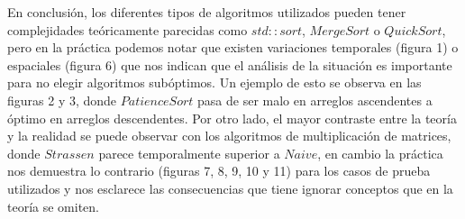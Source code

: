 En conclusión, los diferentes tipos de algoritmos utilizados pueden tener complejidades teóricamente parecidas como $std::sort$, $MergeSort$ o $QuickSort$, pero en la práctica podemos notar que existen variaciones temporales (figura 1) o espaciales (figura 6) que nos indican que el análisis de la situación es importante para no elegir algoritmos subóptimos.
Un ejemplo de esto se observa en las figuras 2 y 3, donde $PatienceSort$ pasa de ser malo en arreglos ascendentes a óptimo en arreglos descendentes.
Por otro lado, el mayor contraste entre la teoría y la realidad se puede observar con los algoritmos de multiplicación de matrices, donde $Strassen$ parece temporalmente superior a $Naive$, en cambio la práctica nos demuestra lo contrario (figuras 7, 8, 9, 10 y 11) para los casos de prueba utilizados y nos esclarece las consecuencias que tiene ignorar conceptos que en la teoría se omiten.
